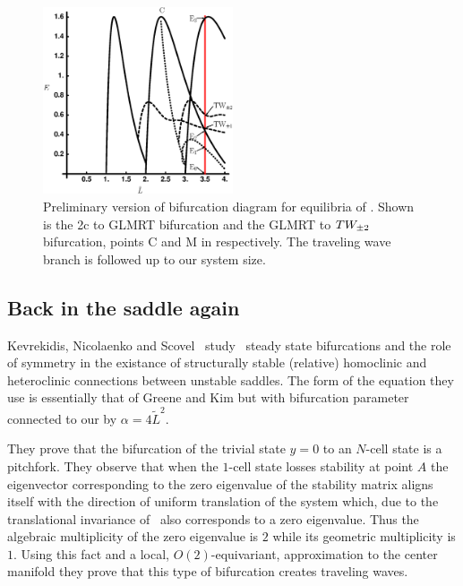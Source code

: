 \begin{figure}[t]
\centering
\includegraphics[width=0.5\textwidth]{figs/ksBifDiag.eps}
\caption{
    {\small
    Preliminary version of bifurcation diagram for equilibria of \KSe.  Shown is the 2c to GLMRT bifurcation and the GLMRT to $TW_{\pm2}$ bifurcation, points C and M in  respectively. The traveling wave branch is followed up to our system size.} %
        }
\label{fig:ksBifDiag}
\end{figure}

\subsection{Back in the saddle again}

Kevrekidis, Nicolaenko and Scovel~ study \KSe\ steady state 
bifurcations and the role of symmetry in the existance of structurally stable (relative) homoclinic and heteroclinic connections between unstable saddles. The form  of the equation they use is
essentially that of Greene and Kim but with bifurcation parameter connected to our by $\alpha=4\tilde{L}^2$.


They prove that the bifurcation of the trivial state $y=0$ to an $N$-cell state is a pitchfork. 
They observe that when the $1$-cell state losses stability at point $A$ the
eigenvector corresponding to the zero eigenvalue of the stability matrix aligns itself with the direction of uniform translation of the
system which, due to the translational invariance of \KSe\, also corresponds to a zero eigenvalue. Thus the algebraic multiplicity of the zero eigenvalue is $2$ while its geometric multiplicity is $1$. Using this fact and a local, $O(2)$-equivariant, approximation to the center manifold they prove that this type of bifurcation creates traveling waves.

